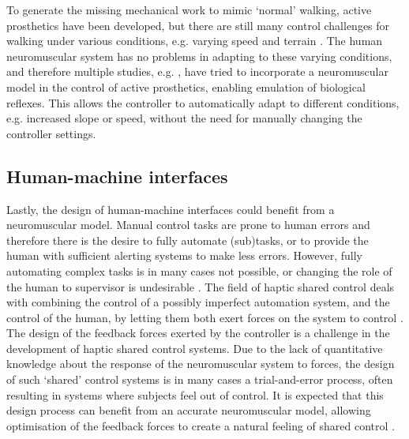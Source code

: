 To generate the missing mechanical work to mimic `normal' walking, active prosthetics have been developed, but there are still many control challenges for walking under various conditions, e.g. varying speed and terrain \cite{markowitz_speed_2011}. The human neuromuscular system has no problems in adapting to these varying conditions, and therefore multiple studies, e.g. \cite{eilenberg_control_2010, markowitz_speed_2011, eilenberg_development_2018}, have tried to incorporate a neuromuscular model in the control of active prosthetics, enabling emulation of biological reflexes. This allows the controller to automatically adapt to different conditions, e.g. increased slope or speed, without the need for manually changing the controller settings. 

\subsection*{Human-machine interfaces}
Lastly, the design of human-machine interfaces could benefit from a neuromuscular model. Manual control tasks are prone to human errors and therefore there is the desire to fully automate (sub)tasks, or to provide the human with sufficient alerting systems to make less errors. However, fully automating complex tasks is in many cases not possible, or changing the role of the human to supervisor is undesirable \cite{sheridan_humans_2002}. The field of haptic shared control deals with combining the control of a possibly imperfect automation system, and the control of the human, by letting them both exert forces on the system to control \cite{hosseini_neuromuscular_2010}. The design of the feedback forces exerted by the controller is a challenge in the development of haptic shared control systems. Due to the lack of quantitative knowledge about the response of the neuromuscular system to forces, the design of such `shared' control systems is in many cases a trial-and-error process, often resulting in systems where subjects feel out of control. It is expected that this design process can benefit from an accurate neuromuscular model, allowing optimisation of the feedback forces to create a natural feeling of shared control \cite{hosseini_neuromuscular_2010}. 

